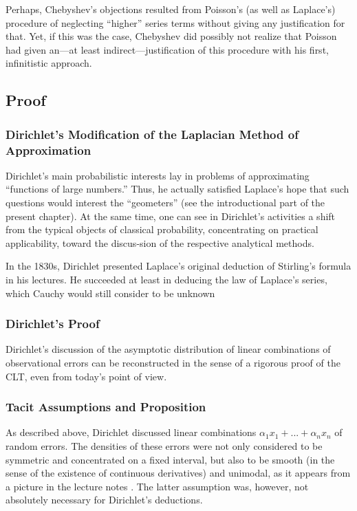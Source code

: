 \documentclass{article}
\begin{document}
Perhaps, Chebyshev’s objections resulted from Poisson’s (as well as Laplace’s)
procedure of neglecting “higher” series terms without giving any justification for
that. Yet, if this was the case, Chebyshev did possibly not realize that Poisson had
given an—at least indirect—justification of this procedure with his first, infinitistic
approach.

\subsection{Proof}
\subsubsection{Dirichlet’s Modification of the Laplacian Method
of Approximation}
Dirichlet’s main probabilistic interests lay in problems of approximating “functions
of large numbers.” Thus, he actually satisfied Laplace’s hope that such questions
would interest the “geometers” (see the introductional part of the present chapter).
At the same time, one can see in Dirichlet’s activities a shift from the typical objects of classical probability, concentrating on practical applicability, toward the discus-sion of the respective analytical methods.

In the 1830s, Dirichlet presented Laplace’s original deduction of Stirling’s formula in his lectures.
He succeeded at least in deducing the law of Laplace’s series, which Cauchy \cite{1852Comptes} would still consider to be unknown

\subsubsection{ Dirichlet’s Proof}
Dirichlet’s discussion of the asymptotic distribution of linear combinations of
observational errors can be reconstructed in the sense of a rigorous proof of the
CLT, even from today’s point of view.
\subsubsection{Tacit Assumptions and Proposition}
As described above, Dirichlet discussed linear combinations $ \alpha_1x_1+ ... +\alpha_n x_n$ of
random errors.
The densities of these errors were not only considered to be symmetric and concentrated on a fixed interval, but also to be smooth (in the sense of the existence of continuous derivatives) and unimodal, as it appears from a picture in the lecture notes \cite{Hardy2013Dirchlet}. 
The latter assumption was, however, not absolutely necessary for Dirichlet’s deductions.
\end{document}
